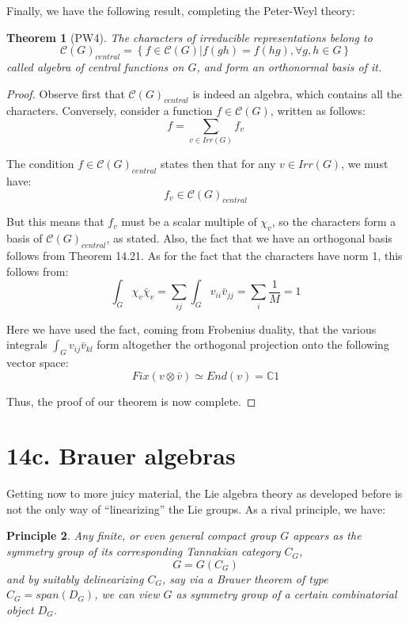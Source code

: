 \documentclass[12pt]{amsbook}
\newtheorem{theorem}{Theorem}[chapter]
\newtheorem{principle}[theorem]{Principle}
\begin{document}
Finally, we have the following result, completing the Peter-Weyl theory:


\begin{theorem}[PW4]
The characters of irreducible representations belong to
$$\mathcal C(G)_{central}=\left\{f\in\mathcal C(G)\Big|f(gh)=f(hg),\forall g,h\in G\right\}$$
called algebra of central functions on $G$, and form an orthonormal basis of it.
\end{theorem}

\begin{proof}
Observe first that $\mathcal C(G)_{central}$ is indeed an algebra, which contains all the characters. Conversely, consider a function $f\in\mathcal C(G)$, written as follows:
$$f=\sum_{v\in Irr(G)}f_v$$

The condition $f\in\mathcal C(G)_{central}$ states then that for any $v\in Irr(G)$, we must have:
$$f_v\in\mathcal C(G)_{central}$$

But this means that $f_v$ must be a scalar multiple of $\chi_v$, so the characters form a basis of $\mathcal C(G)_{central}$, as stated. Also, the fact that we have an orthogonal basis follows from Theorem 14.21. As for the fact that the characters have norm 1, this follows from:
$$\int_G\chi_v\bar{\chi}_v
=\sum_{ij}\int_Gv_{ii}\bar{v}_{jj}
=\sum_i\frac{1}{M}
=1$$

Here we have used the fact, coming from Frobenius duality, that the various integrals $\int_Gv_{ij}\bar{v}_{kl}$ form altogether the orthogonal projection onto the following vector space:
$$Fix(v\otimes\bar{v})\simeq End(v)=\mathbb C1$$

Thus, the proof of our theorem is now complete.
\end{proof}

\section*{14c. Brauer algebras}

Getting now to more juicy material, the Lie algebra theory as developed before is not the only way of ``linearizing'' the Lie groups. As a rival principle, we have:

\begin{principle}
Any finite, or even general compact group $G$ appears as the symmetry group of its corresponding Tannakian category $C_G$,
$$G=G(C_G)$$
and by suitably delinearizing $C_G$, say via a Brauer theorem of type $C_G=span(D_G)$, we can view $G$ as symmetry group of a certain combinatorial object $D_G$.
\end{principle}
\end{document}
